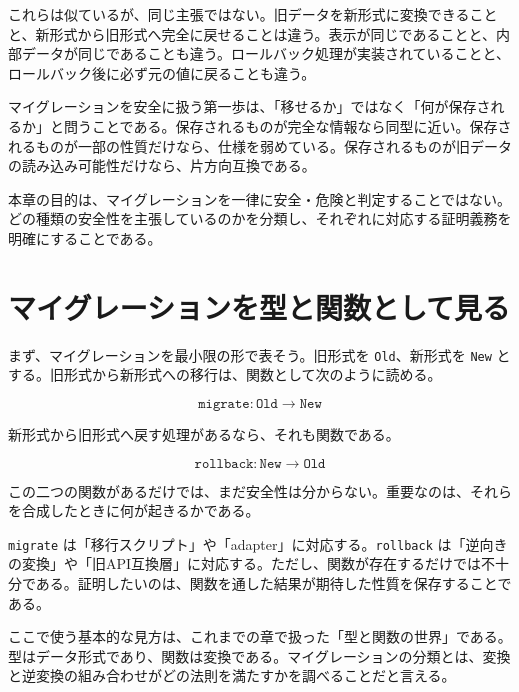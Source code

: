 これらは似ているが、同じ主張ではない。旧データを新形式に変換できることと、新形式から旧形式へ完全に戻せることは違う。表示が同じであることと、内部データが同じであることも違う。ロールバック処理が実装されていることと、ロールバック後に必ず元の値に戻ることも違う。

\begin{intuitionbox}
マイグレーションを安全に扱う第一歩は、「移せるか」ではなく「何が保存されるか」と問うことである。保存されるものが完全な情報なら同型に近い。保存されるものが一部の性質だけなら、仕様を弱めている。保存されるものが旧データの読み込み可能性だけなら、片方向互換である。
\end{intuitionbox}

本章の目的は、マイグレーションを一律に安全・危険と判定することではない。どの種類の安全性を主張しているのかを分類し、それぞれに対応する証明義務を明確にすることである。


\section{マイグレーションを型と関数として見る}

まず、マイグレーションを最小限の形で表そう。旧形式を \texttt{Old}、新形式を \texttt{New} とする。旧形式から新形式への移行は、関数として次のように読める。

\[
\texttt{migrate} : \texttt{Old} \to \texttt{New}
\]

新形式から旧形式へ戻す処理があるなら、それも関数である。

\[
\texttt{rollback} : \texttt{New} \to \texttt{Old}
\]

この二つの関数があるだけでは、まだ安全性は分からない。重要なのは、それらを合成したときに何が起きるかである。

\begin{softwarebox}
\texttt{migrate} は「移行スクリプト」や「adapter」に対応する。\texttt{rollback} は「逆向きの変換」や「旧API互換層」に対応する。ただし、関数が存在するだけでは不十分である。証明したいのは、関数を通した結果が期待した性質を保存することである。
\end{softwarebox}

ここで使う基本的な見方は、これまでの章で扱った「型と関数の世界」である。型はデータ形式であり、関数は変換である。マイグレーションの分類とは、変換と逆変換の組み合わせがどの法則を満たすかを調べることだと言える。

